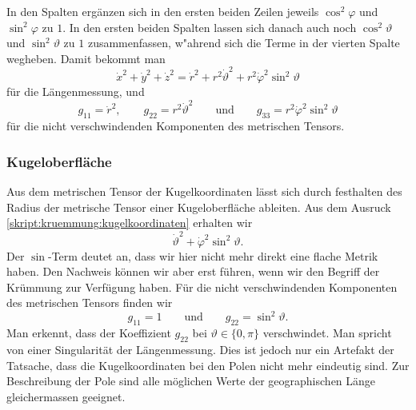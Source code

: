 In den Spalten ergänzen sich in den ersten beiden Zeilen jeweils
$\cos^2\varphi$ und $\sin^2\varphi$ zu $1$.
In den ersten beiden Spalten lassen sich danach auch noch
$\cos^2\vartheta$ und $\sin^2\vartheta$ zu $1$ zusammenfassen,
w"ahrend sich die Terme in der vierten Spalte wegheben.
Damit bekommt man
\begin{equation}
\dot x^2 + \dot y^2 + \dot z^2
=
\dot r^2+r^2\dot\vartheta^2 + r^2\dot\varphi^2\sin^2\vartheta
\label{skript:kruemmung:kugelkoordinaten}
\end{equation}
für die Längenmessung, und
\[
g_{11}=\dot r^2,\qquad
g_{22}=r^2\dot\vartheta^2
\qquad\text{und}\qquad
g_{33}= r^2\dot\varphi^2\sin^2\vartheta
\]
für die nicht verschwindenden Komponenten des metrischen Tensors.

\subsubsection{Kugeloberfläche}
Aus dem metrischen Tensor der Kugelkoordinaten lässt sich durch festhalten
des Radius der metrische Tensor einer Kugeloberfläche ableiten.
Aus dem Ausruck \eqref{skript:kruemmung:kugelkoordinaten}
erhalten wir
\[
\dot\vartheta^2+\dot\varphi^2\sin^2\vartheta.
\]
Der $\sin$-Term deutet an, dass wir hier nicht mehr direkt eine flache
Metrik haben.
Den Nachweis können wir aber erst führen, wenn wir den Begriff der
Krümmung zur Verfügung haben.
Für die nicht verschwindenden Komponenten des metrischen Tensors
finden wir
\[
g_{11} = 1
\qquad\text{und}\qquad
g_{22}=\sin^2\vartheta.
\]
Man erkennt, dass der Koeffizient $g_{22}$ bei $\vartheta \in\{0,\pi\}$
verschwindet.
Man spricht von einer Singularität der Längenmessung.
Dies ist jedoch nur ein Artefakt der Tatsache, dass die Kugelkoordinaten
bei den Polen nicht mehr eindeutig sind.
Zur Beschreibung der Pole sind alle möglichen Werte der geographischen
Länge gleichermassen geeignet.


